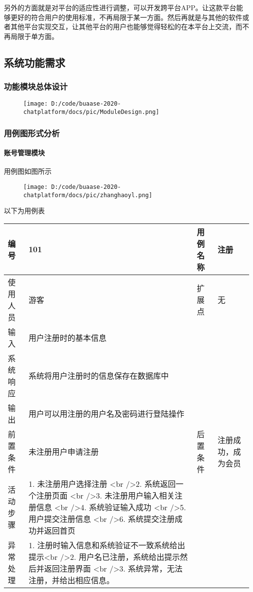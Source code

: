 \documentclass[
]{article}
\begin{document}
另外的方面就是对平台的适应性进行调整，可以开发跨平台APP。让这款平台能够更好的符合用户的使用标准，不再局限于某一方面。然后再就是与其他的软件或者其他平台实现交互，让其他平台的用户也能够觉得轻松的在本平台上交流，而不再局限于单方面。

\hypertarget{header-n105}{%
\subsection{系统功能需求}\label{header-n105}}

\hypertarget{header-n106}{%
\subsubsection{功能模块总体设计}\label{header-n106}}

\begin{figure}
\centering
\texttt{[image: D:/code/buaase-2020-chatplatform/docs/pic/ModuleDesign.png]}
\caption{}
\end{figure}

\hypertarget{header-n108}{%
\subsubsection{用例图形式分析}\label{header-n108}}

\hypertarget{header-n109}{%
\paragraph{账号管理模块}\label{header-n109}}

用例图如图所示

\begin{figure}
\centering
\texttt{[image: D:/code/buaase-2020-chatplatform/docs/pic/zhanghaoyl.png]}
\caption{}
\end{figure}

以下为用例表

\begin{longtable}[]{@{}llll@{}}
\toprule
编号 & 101 & 用例名称 & 注册\tabularnewline
\midrule
\endhead
使用人员 & 游客 & 扩展点 & 无\tabularnewline
输入 & 用户注册时的基本信息 & &\tabularnewline
系统响应 & 系统将用户注册时的信息保存在数据库中 & &\tabularnewline
输出 & 用户可以用注册的用户名及密码进行登陆操作 & &\tabularnewline
前置条件 & 未注册用户申请注册 & 后置条件 &
注册成功，成为会员\tabularnewline
活动步骤 & 1. 未注册用户选择注册 \textless br /\textgreater{}2.
系统返回一个注册页面 \textless br /\textgreater{}3.
未注册用户输入相关注册信息 \textless br /\textgreater{}4.
系统验证输入成功 \textless br /\textgreater{}5. 用户提交注册信息
\textless br /\textgreater{}6. 系统提交注册成功并返回首页 &
&\tabularnewline
异常处理 & 1. 注册时输入信息和系统验证不一致系统给出提示\textless br
/\textgreater{}2. 用户名已注册，系统给出提示然后并返回注册界面
\textless br /\textgreater{}3. 系统异常，无法注册，并给出相应信息。 &
&\tabularnewline
\bottomrule
\end{longtable}
\end{document}
